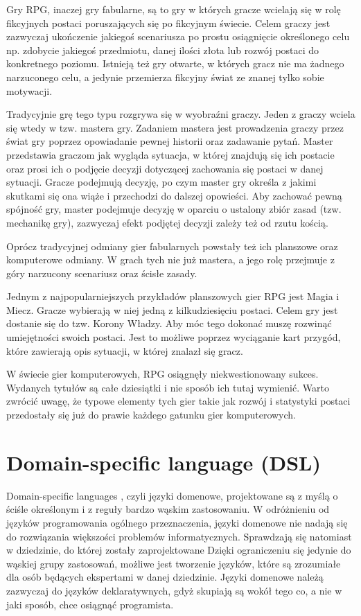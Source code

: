 \documentclass[openright]{xmgr}
\begin{document}
Gry RPG, inaczej gry fabularne, są to gry w których gracze wcielają się w rolę fikcyjnych postaci poruszających się po fikcyjnym świecie.  Celem graczy jest zazwyczaj ukończenie jakiegoś scenariusza po prostu osiągnięcie określonego celu np. zdobycie jakiegoś przedmiotu, danej ilości złota lub rozwój postaci do konkretnego poziomu. Istnieją też gry otwarte, w których gracz nie ma żadnego narzuconego celu, a jedynie przemierza fikcyjny świat ze znanej tylko sobie motywacji. 

Tradycyjnie grę tego typu rozgrywa się w wyobraźni graczy. Jeden z graczy wciela się wtedy w tzw. mastera gry. Zadaniem mastera jest prowadzenia graczy przez świat gry poprzez opowiadanie pewnej historii oraz zadawanie pytań. Master przedstawia graczom jak wygląda sytuacja, w której znajdują się ich postacie oraz prosi ich o podjęcie decyzji dotyczącej zachowania się postaci w danej sytuacji. Gracze podejmują decyzję, po czym master gry określa z jakimi skutkami się ona wiąże i przechodzi do dalszej opowieści. Aby zachować pewną spójność gry, master podejmuje decyzję w oparciu o ustalony zbiór zasad (tzw. mechanikę gry), zazwyczaj efekt podjętej decyzji zależy też od rzutu kością.

Oprócz tradycyjnej odmiany gier fabularnych powstały też ich planszowe oraz komputerowe odmiany. W grach tych nie już mastera, a jego rolę przejmuje z góry narzucony scenariusz oraz ścisłe zasady. 

Jednym z najpopularniejszych przykładów planszowych gier RPG jest Magia i Miecz. Gracze wybierają w niej jedną z kilkudziesięciu postaci. Celem gry jest dostanie się do tzw. Korony Władzy. Aby móc tego dokonać muszę rozwinąć umiejętności swoich postaci. Jest to możliwe poprzez wyciąganie kart przygód, które zawierają opis sytuacji, w której znalazł się gracz. 

W świecie gier komputerowych, RPG osiągnęły niekwestionowany sukces. Wydanych tytułów są całe dziesiątki i nie sposób ich tutaj wymienić. Warto zwrócić uwagę, że typowe elementy tych gier takie jak rozwój i statystyki postaci przedostały się już do prawie każdego gatunku gier komputerowych.

\section{Domain-specific language (DSL)}

Domain-specific languages \cite{DSL:2017}, czyli języki domenowe, projektowane są z myślą o ściśle określonym i z reguły bardzo wąskim zastosowaniu. W odróżnieniu od języków programowania ogólnego przeznaczenia, języki domenowe nie nadają się do rozwiązania większości problemów informatycznych. Sprawdzają się natomiast w dziedzinie, do której zostały zaprojektowane Dzięki ograniczeniu się jedynie do wąskiej grupy zastosowań, możliwe jest tworzenie języków, które są zrozumiałe dla osób będących ekspertami w danej dziedzinie. Języki domenowe należą zazwyczaj do języków deklaratywnych, gdyż skupiają są wokół tego co, a nie w jaki sposób, chce osiągnąć programista.
\end{document}
